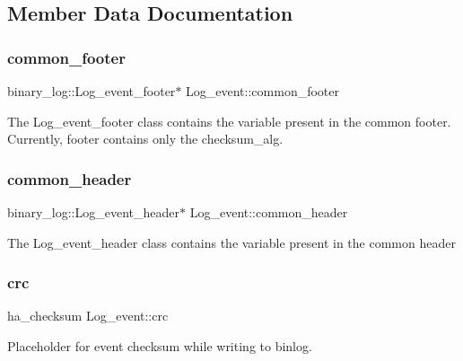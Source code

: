 \subsection{Member Data Documentation}
\mbox{\label{classLog__event_a1280a16e7f198401154ea83667b9d0d7}} 
\subsubsection{\texorpdfstring{common\+\_\+footer}{common\_footer}}
{\footnotesize\ttfamily binary\+\_\+log\+::\+Log\+\_\+event\+\_\+footer$\ast$ Log\+\_\+event\+::common\+\_\+footer}

The Log\+\_\+event\+\_\+footer class contains the variable present in the common footer. Currently, footer contains only the checksum\+\_\+alg. \mbox{\label{classLog__event_ac9c5b6494544de6b569351b919f75d57}} 
\subsubsection{\texorpdfstring{common\+\_\+header}{common\_header}}
{\footnotesize\ttfamily binary\+\_\+log\+::\+Log\+\_\+event\+\_\+header$\ast$ Log\+\_\+event\+::common\+\_\+header}

The Log\+\_\+event\+\_\+header class contains the variable present in the common header \mbox{\label{classLog__event_a39cb75b9f87ead22ad5a3971946e30c0}} 
\subsubsection{\texorpdfstring{crc}{crc}}
{\footnotesize\ttfamily ha\+\_\+checksum Log\+\_\+event\+::crc}

Placeholder for event checksum while writing to binlog. \mbox{\label{classLog__event_a243eff824952a8d0021ef80e845945fe}} 
